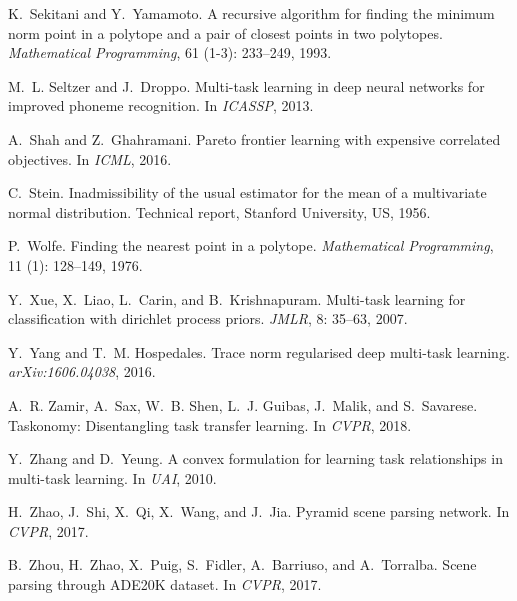 \documentclass{article}
\begin{document}
{\begin{thebibliography}{60}
K.~Sekitani and Y.~Yamamoto.
\newblock A recursive algorithm for finding the minimum norm point in a
  polytope and a pair of closest points in two polytopes.
\newblock \emph{Mathematical Programming}, 61 (1-3):
  233--249, 1993.

M.~L. Seltzer and J.~Droppo.
\newblock Multi-task learning in deep neural networks for improved phoneme
  recognition.
\newblock In \emph{ICASSP}, 2013.

A.~Shah and Z.~Ghahramani.
\newblock Pareto frontier learning with expensive correlated objectives.
\newblock In \emph{{ICML}}, 2016.

C.~Stein.
\newblock Inadmissibility of the usual estimator for the mean of a multivariate
  normal distribution.
\newblock Technical report, Stanford University, US, 1956.

P.~Wolfe.
\newblock Finding the nearest point in a polytope.
\newblock \emph{Mathematical Programming}, 11 (1): 128--149,
  1976.

Y.~Xue, X.~Liao, L.~Carin, and B.~Krishnapuram.
\newblock Multi-task learning for classification with dirichlet process priors.
\newblock \emph{JMLR}, 8: 35--63, 2007.

Y.~Yang and T.~M. Hospedales.
\newblock Trace norm regularised deep multi-task learning.
\newblock \emph{arXiv:1606.04038}, 2016.

A.~R. Zamir, A.~Sax, W.~B. Shen, L.~J. Guibas, J.~Malik, and S.~Savarese.
\newblock Taskonomy: Disentangling task transfer learning.
\newblock In \emph{CVPR}, 2018.

Y.~Zhang and D.~Yeung.
\newblock A convex formulation for learning task relationships in multi-task
  learning.
\newblock In \emph{{UAI}}, 2010.

H.~Zhao, J.~Shi, X.~Qi, X.~Wang, and J.~Jia.
\newblock Pyramid scene parsing network.
\newblock In \emph{{CVPR}}, 2017.

B.~Zhou, H.~Zhao, X.~Puig, S.~Fidler, A.~Barriuso, and A.~Torralba.
\newblock Scene parsing through {ADE20K} dataset.
\newblock In \emph{{CVPR}}, 2017{}.


\end{thebibliography}}
\end{document}
